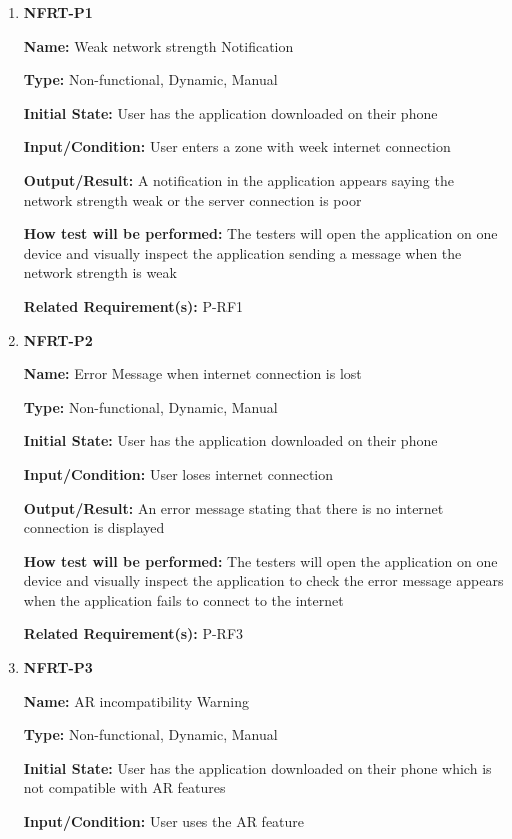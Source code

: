\documentclass[12pt, titlepage]{article}
\begin{document}
\begin{enumerate}
\item{\textbf{NFRT-P1}}

\textbf{Name:} Weak network strength Notification

\textbf{Type:} Non-functional, Dynamic, Manual
					
\textbf{Initial State:} User has the application downloaded on their phone
					
\textbf{Input/Condition:} User enters a zone with week internet connection
					
\textbf{Output/Result:} A notification in the application appears saying the network strength weak or the server connection is poor

\textbf{How test will be performed:} The testers will open the application on one device and visually inspect the application sending a message when the network strength is weak

\textbf{Related Requirement(s):} P-RF1

\item{\textbf{NFRT-P2}}

\textbf{Name:} Error Message when internet connection is lost

\textbf{Type:} Non-functional, Dynamic, Manual
					
\textbf{Initial State:} User has the application downloaded on their phone
					
\textbf{Input/Condition:} User loses internet connection
					
\textbf{Output/Result:} An error message stating that there is no internet connection is displayed

\textbf{How test will be performed:} The testers will open the application on one device and visually inspect the application to check the error message appears when the application fails to connect to the internet

\textbf{Related Requirement(s):} P-RF3

\item{\textbf{NFRT-P3}}

\textbf{Name:} AR incompatibility Warning

\textbf{Type:} Non-functional, Dynamic, Manual
					
\textbf{Initial State:} User has the application downloaded on their phone which is not compatible with AR features
					
\textbf{Input/Condition:} User uses the AR feature
					

\end{enumerate}
\end{document}

